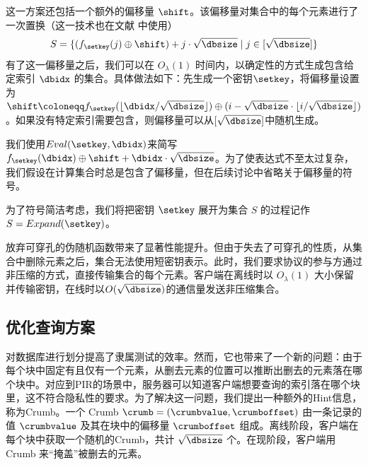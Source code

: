 这一方案还包括一个额外的偏移量 $\shift$。该偏移量对集合中的每个元素进行了一次置换（这一技术也在文献 \cite{EC:CorKog20, C:LazPap23} 中使用）
$$S = \{(f_{\setkey}(j)\oplus \shift) + j \cdot \sqrt{\dbsize} \mid j \in [\sqrt{\dbsize}]\}$$
有了这一偏移量之后，我们可以在 $O_\lambda(1)$ 时间内，以确定性的方式生成包含给定索引 $\dbidx$ 的集合。具体做法如下：先生成一个密钥$\setkey$，将偏移量设置为$\shift \coloneqq f_{\setkey}(\lfloor \dbidx/\sqrt{\dbsize}\rfloor) \oplus (i - \sqrt{\dbsize}\cdot\lfloor i/\sqrt{\dbsize}\rfloor)$。如果没有特定索引需要包含，则偏移量可以从$[\sqrt{\dbsize}]$中随机生成。

我们使用$Eval(\setkey,\dbidx)$来简写$f_{\setkey}(\dbidx)\oplus \shift + \dbidx\cdot\sqrt{\dbsize}$。为了使表达式不至太过复杂，我们假设在计算集合时总是包含了偏移量，但在后续讨论中省略关于偏移量的符号。

为了符号简洁考虑，我们将把密钥 $\setkey$ 展开为集合 $S$ 的过程记作 $S = Expand(\setkey)$。

放弃可穿孔的伪随机函数带来了显著性能提升。但由于失去了可穿孔的性质，从集合中删除元素之后，集合无法使用短密钥表示。此时，我们要求协议的参与方通过非压缩的方式，直接传输集合的每个元素。客户端在离线时以 $O_\lambda(1)$ 大小保留并传输密钥，在线时以$O(\sqrt{\dbsize})$的通信量发送非压缩集合。

\subsection{优化查询方案}
\label{sec:problem-of-dividing}
对数据库进行划分提高了隶属测试的效率。然而，它也带来了一个新的问题：由于每个块中固定有且仅有一个元素，从删去元素的位置可以推断出删去的元素落在哪个块中。对应到PIR的场景中，服务器可以知道客户端想要查询的索引落在哪个块里，这不符合隐私性的要求。为了解决这一问题，我们提出一种额外的Hint信息，称为Crumb。一个 Crumb $\crumb=(\crumbvalue, \crumboffset)$ 由一条记录的值 $\crumbvalue$ 及其在块中的偏移量 $\crumboffset$ 组成。离线阶段，客户端在每个块中获取一个随机的Crumb，共计 $\sqrt{\dbsize}$ 个。在现阶段，客户端用 Crumb 来“掩盖”被删去的元素。

